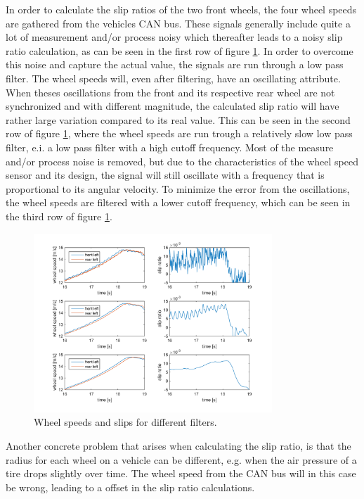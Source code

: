 In order to calculate the slip ratios of the two front wheels, the four wheel speeds are gathered from the vehicles CAN bus. These signals generally include quite a lot of measurement and/or process noisy which thereafter leads to a noisy slip ratio calculation, as can be seen in the first row of figure \ref{wheel_speed_and_slip}. In order to overcome this noise and capture the actual value, the signals are run through a low pass filter. The wheel speeds will, even after filtering, have an oscillating attribute. When theses oscillations from the front and its respective rear wheel are not synchronized and with different magnitude, the calculated slip ratio will have rather large variation compared to its real value. This can be seen in the second row of figure \ref{wheel_speed_and_slip}, where the wheel speeds are run trough a relatively slow low pass filter, e.i. a low pass filter with a high cutoff frequency. Most of the measure and/or process noise is removed, but due to the characteristics of the wheel speed sensor and its design, the signal will still oscillate with a frequency that is  proportional to its angular velocity. To minimize the error from the oscillations, the wheel speeds are filtered with a lower cutoff frequency, which can be seen in the third row of figure \ref{wheel_speed_and_slip}. 

\begin{figure}[h]
	\centering
	\includegraphics[width=0.8\textwidth]{Pictures/wheel_speed_and_slip}
	\caption {Wheel speeds and slips for different filters.}
	\label{wheel_speed_and_slip}
\end{figure}


Another concrete problem that arises when calculating the slip ratio, is that the radius for each wheel on a vehicle can be different, e.g. when the air pressure of a tire drops slightly over time. The wheel speed from the CAN bus will in this case be wrong, leading to a offset in the slip ratio calculations.

